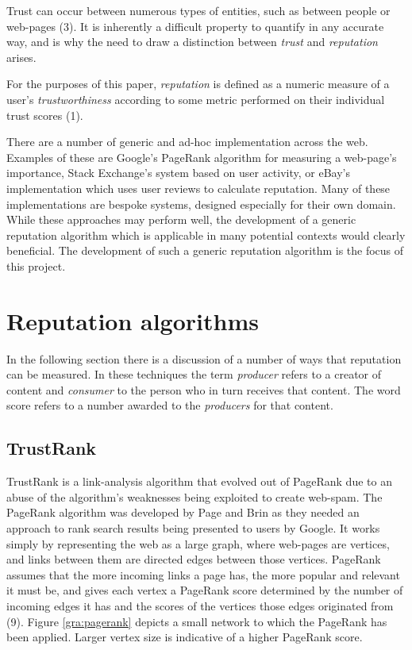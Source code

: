 \documentclass[]{final_report}
\begin{document}
Trust can occur between numerous types of entities, such as between people or web-pages (3). It is inherently a difficult property to quantify in any accurate way, and is why the need to draw a distinction between \textsl{trust} and \textsl{reputation} arises.

For the purposes of this paper, \textsl{reputation} is defined as a numeric measure of a user's \textsl{trustworthiness} according to some metric performed on their individual trust scores (1).

There are a number of generic and ad-hoc implementation across the web. Examples of these are Google's PageRank algorithm for measuring a web-page's importance, Stack Exchange's system based on user activity, or eBay's implementation which uses user reviews to calculate reputation. Many of these implementations are bespoke systems, designed especially for their own domain. While these approaches may perform well, the development of a generic reputation algorithm which is applicable in many potential contexts would clearly beneficial. The development of such a generic reputation algorithm is the focus of this project.


\section{Reputation algorithms}

In the following section there is a discussion of a number of ways that reputation can be measured. In these techniques the term \textsl{producer} refers to a creator of content and \textsl{consumer} to the person who in turn receives that content. The word score refers to a number awarded to the \textsl{producers} for that content.


\subsection{TrustRank}

TrustRank is a link-analysis algorithm that evolved out of PageRank due to an abuse of the algorithm's weaknesses being exploited to create web-spam. The PageRank algorithm was developed by Page and Brin as they needed an approach to rank search results being presented to users by Google. It works simply by representing the web as a large graph, where web-pages are vertices, and links between them are directed edges between those vertices. PageRank assumes that the more incoming links a page has, the more popular and relevant it must be, and gives each vertex a PageRank score determined by the number of incoming edges it has and the scores of the vertices those edges originated from (9). Figure \ref{gra:pagerank} depicts a small network to which the PageRank has been applied. Larger vertex size is indicative of a higher PageRank score.
\end{document}
